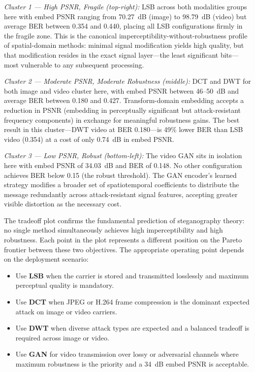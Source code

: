 \documentclass[conference]{IEEEtran}
\begin{document}
\textit{Cluster 1 — High PSNR, Fragile (top-right):} LSB across both
modalities groups here with embed PSNR ranging from 70.27~dB
(image) to 98.79~dB (video) but average BER between 0.354 and 0.440,
placing all LSB configurations firmly in the fragile zone. This is the
canonical imperceptibility-without-robustness profile of spatial-domain
methods: minimal signal modification yields high quality, but that
modification resides in the exact signal layer—the least significant
bits—most vulnerable to any subsequent processing.

\textit{Cluster 2 — Moderate PSNR, Moderate Robustness (middle):}
DCT and DWT for both image and video cluster here, with embed PSNR
between 46--50~dB and average BER between 0.180 and 0.427. Transform-domain
embedding accepts a reduction in PSNR (embedding in perceptually
significant but attack-resistant frequency components) in exchange for
meaningful robustness gains. The best result in this cluster—DWT video
at BER 0.180—is 49\% lower BER than LSB video (0.354) at a cost of
only 0.74~dB in embed PSNR.

\textit{Cluster 3 — Low PSNR, Robust (bottom-left):} The video GAN
sits in isolation here with embed PSNR of 34.03~dB and BER of 0.148.
No other configuration achieves BER below 0.15 (the robust threshold).
The GAN encoder's learned strategy modifies a broader set of
spatiotemporal coefficients to distribute the message redundantly
across attack-resistant signal features, accepting greater visible
distortion as the necessary cost.

The tradeoff plot confirms the fundamental prediction of steganography
theory: no single method simultaneously achieves high
imperceptibility and high robustness. Each point in the plot represents
a different position on the Pareto frontier between these two
objectives. The appropriate operating point depends on the deployment
scenario:

\begin{itemize}
    \item Use \textbf{LSB} when the carrier is stored and transmitted
    losslessly and maximum perceptual quality is mandatory.
    \item Use \textbf{DCT} when JPEG or H.264 frame compression is
    the dominant expected attack on image or video carriers.
    \item Use \textbf{DWT} when diverse attack types are expected and
    a balanced tradeoff is required across image or video.
    \item Use \textbf{GAN} for video transmission over lossy or
    adversarial channels where maximum robustness is the priority
    and a 34~dB embed PSNR is acceptable.
\end{itemize}
\end{document}
